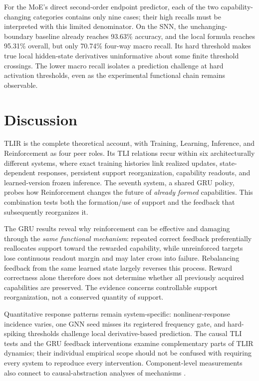 \documentclass[conference,10pt]{IEEEtran}
\begin{document}
For the MoE's direct second-order endpoint predictor, each of the two capability-changing categories contains only nine cases; their high recalls must be interpreted with this limited denominator. On the SNN, the unchanging-boundary baseline already reaches 93.63\% accuracy, and the local formula reaches 95.31\% overall, but only 70.74\% four-way macro recall. Its hard threshold makes true local hidden-state derivatives uninformative about some finite threshold crossings. The lower macro recall isolates a prediction challenge at hard activation thresholds, even as the experimental functional chain remains observable.

\section{Discussion}
TLIR is the complete theoretical account, with Training, Learning, Inference, and Reinforcement as four peer roles. Its TLI relations recur within six architecturally different systems, where exact training histories link realized updates, state-dependent responses, persistent support reorganization, capability readouts, and learned-version frozen inference. The seventh system, a shared GRU policy, probes how Reinforcement changes the future of \emph{already formed} capabilities. This combination tests both the formation/use of support and the feedback that subsequently reorganizes it.

The GRU results reveal why reinforcement can be effective and damaging through the \emph{same functional mechanism}: repeated correct feedback preferentially reallocates support toward the rewarded capability, while unreinforced targets lose continuous readout margin and may later cross into failure. Rebalancing feedback from the same learned state largely reverses this process. Reward correctness alone therefore does not determine whether all previously acquired capabilities are preserved. The evidence concerns controllable support reorganization, not a conserved quantity of support.

Quantitative response patterns remain system-specific: nonlinear-response incidence varies, one GNN seed misses its registered frequency gate, and hard-spiking thresholds challenge local derivative-based prediction. The causal TLI tests and the GRU feedback interventions examine complementary parts of TLIR dynamics; their individual empirical scope should not be confused with requiring every system to reproduce every intervention. Component-level measurements also connect to causal-abstraction analyses of mechanisms \cite{geiger2025}.
\end{document}
